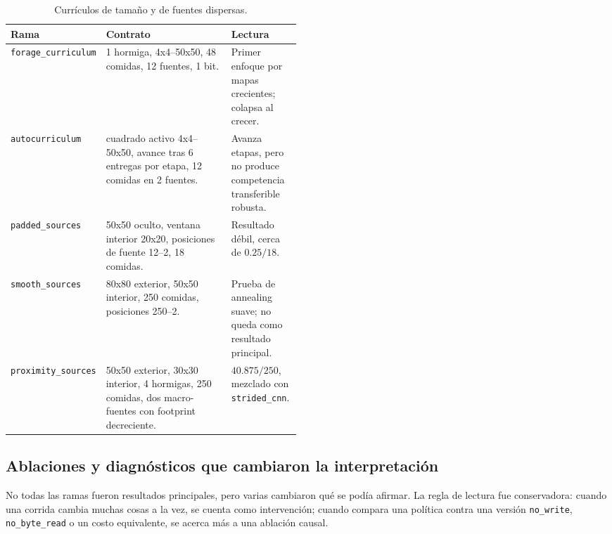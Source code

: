\documentclass[11pt,a4paper]{article}
\newcommand{\run}[1]{\nolinkurl{#1}}
\begin{document}
\begin{table}[h]
\centering
\caption{Currículos de tamaño y de fuentes dispersas.}
\begin{tabularx}{\linewidth}{>{\raggedright\arraybackslash}p{0.24\linewidth}X>{\raggedright\arraybackslash}p{0.24\linewidth}}
\toprule
Rama & Contrato & Lectura \\
\midrule
\run{forage_curriculum} & 1 hormiga, 4x4--50x50, 48 comidas, 12 fuentes, 1 bit. & Primer enfoque por mapas crecientes; colapsa al crecer. \\
\run{autocurriculum} & cuadrado activo 4x4--50x50, avance tras 6 entregas por etapa, 12 comidas en 2 fuentes. & Avanza etapas, pero no produce competencia transferible robusta. \\
\run{padded_sources} & 50x50 oculto, ventana interior 20x20, posiciones de fuente 12--2, 18 comidas. & Resultado débil, cerca de \(0.25/18\). \\
\run{smooth_sources} & 80x80 exterior, 50x50 interior, 250 comidas, posiciones 250--2. & Prueba de annealing suave; no queda como resultado principal. \\
\run{proximity_sources} & 50x50 exterior, 30x30 interior, 4 hormigas, 250 comidas, dos macro-fuentes con footprint decreciente. & \(40.875/250\), mezclado con \run{strided_cnn}. \\
\bottomrule
\end{tabularx}
\end{table}

\subsection{Ablaciones y diagnósticos que cambiaron la interpretación}

No todas las ramas fueron resultados principales, pero varias cambiaron qué se podía afirmar. La regla de lectura fue conservadora: cuando una corrida cambia muchas cosas a la vez, se cuenta como intervención; cuando compara una política contra una versión \run{no_write}, \run{no_byte_read} o un costo equivalente, se acerca más a una ablación causal.
\end{document}
